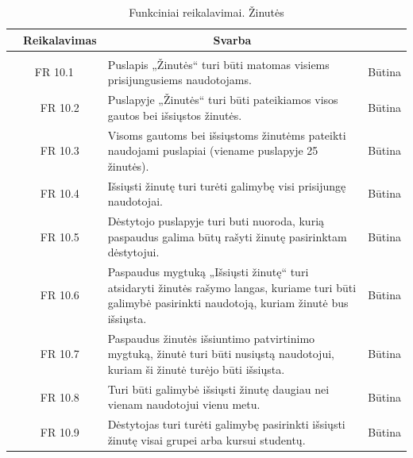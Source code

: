 \documentclass{VUMIFPSkursinis}
\begin{document}
	\begin{table}[H]
	\caption{Funkciniai reikalavimai. Žinutės}
	\begin{tabular}{|p{1cm}|p{1cm}|p{}|p{}|}
		\hline 
		\rowcolor{gray!50}
		\multicolumn{2}{|c|}{{\bfseries Kodas}}&
		\multicolumn{1}{c|}{{\bfseries Reikalavimas}}&
		\multicolumn{1}{c|}{{\bfseries Svarba}}\\
		\hline
		\rowcolor{lightgray}
		\multicolumn{4}{|c|}{Žinutės}\\		
		
		\hline
		\multicolumn{2}{|c|}{FR 10.1}&
		{Puslapis „Žinutės“ turi būti matomas visiems prisijungusiems naudotojams.
		}&		
		\multicolumn{1}{c|}{Būtina}\\
		\hline
		\multicolumn{1}{|c}{}&
		\multicolumn{1}{c|}{FR 10.2}&
		{Puslapyje „Žinutės“ turi būti pateikiamos visos gautos bei išsiųstos žinutės.
		}&		
		\multicolumn{1}{c|}{Būtina}\\
		\hline
		\multicolumn{1}{|c}{}&
		\multicolumn{1}{c|}{FR 10.3}&
		{Visoms gautoms bei išsiųstoms žinutėms pateikti naudojami puslapiai (viename puslapyje 25 žinutės).
		}&
		\multicolumn{1}{c|}{Būtina}\\	
		\hline		
		\multicolumn{1}{|c}{}&
		\multicolumn{1}{c|}{FR 10.4}&
		{Išsiųsti žinutę turi turėti galimybę visi prisijungę naudotojai.
		}&
		\multicolumn{1}{c|}{Būtina}\\									
		\hline
		\multicolumn{1}{|c}{}&
		\multicolumn{1}{c|}{FR 10.5}&
		{Dėstytojo puslapyje turi buti nuoroda, kurią paspaudus galima būtų rašyti žinutę pasirinktam dėstytojui.
		}&
		\multicolumn{1}{c|}{Būtina}\\	
		\hline	
		\multicolumn{1}{|c}{}&
		\multicolumn{1}{c|}{FR 10.6}&
		{Paspaudus mygtuką „Išsiųsti žinutę“ turi atsidaryti žinutės rašymo langas, kuriame turi būti galimybė pasirinkti naudotoją, kuriam žinutė bus išsiųsta.
		}&
		\multicolumn{1}{c|}{Būtina}\\	
		\hline		
		\multicolumn{1}{|c}{}&
		\multicolumn{1}{c|}{FR 10.7}&
		{Paspaudus žinutės išsiuntimo patvirtinimo mygtuką, žinutė turi būti nusiųstą naudotojui, kuriam ši žinutė turėjo būti išsiųsta.
		}&
		\multicolumn{1}{c|}{Būtina}\\									
		\hline
		\multicolumn{1}{|c}{}&
		\multicolumn{1}{c|}{FR 10.8}&
		{Turi būti galimybė išsiųsti žinutę daugiau nei vienam naudotojui vienu metu.
		}&
		\multicolumn{1}{c|}{Būtina}\\	
		\hline	
		\multicolumn{1}{|c}{}&
		\multicolumn{1}{c|}{FR 10.9}&
		{Dėstytojas turi turėti galimybę pasirinkti išsiųsti žinutę visai grupei arba kursui studentų.
		}&
		\multicolumn{1}{c|}{Būtina}\\	
		\hline		
	\end{tabular}		
\end{table}
\end{document}
